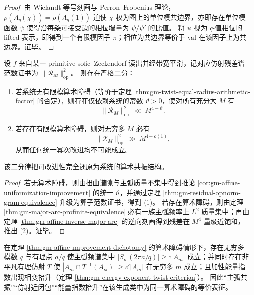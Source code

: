 \begin{proof}
由 Wielandt 等号刻画与 Perron--Frobenius 理论，\(\rho(A_q(\chi))=\rho(A_q(1))\) 迫使 \(\chi\) 权为图上的单位模共边界，亦即存在单位模函数 \(\psi\) 使得沿每条可接受边的相位增量为 \(\psi/\psi'\) 的比值。
将 \(\psi\) 视为 \(q\)-值相位的 lifted 表示，即得到一个有限模因子 \(\pi\)；相位为共边界等价于 \(\mathrm{val}\) 在该因子上为共边界。证毕。
\end{proof}

\begin{theorem}\label{thm:gm-affine-improvement-dichotomy}
设 \(f\) 来自某一 primitive sofic--Zeckendorf 读出并经带宽平滑，记对应仿射残差谱范数证书为 \(\|\mathcal{R}_M\|_{\mathrm{op}}^2\)。
则存在严格二分：
\begin{enumerate}
  \item 若系统无有限模算术障碍（等价于定理 \ref{thm:gm-twist-equal-radius-arithmetic-factor} 的否定），则存在仅依赖系统的常数 \(\vartheta>0\)，使对所有充分大 \(M\) 有
  \[
  \|\mathcal{R}_M\|_{\mathrm{op}}^2\ \ll\ M^{4-\vartheta}.
  \]
  \item 若存在有限模算术障碍，则对无穷多 \(M\) 必有
  \[
  \|\mathcal{R}_M\|_{\mathrm{op}}^2\ \gg\ M^{4-o(1)},
  \]
  从而任何统一幂次改进均不可能成立。
\end{enumerate}
该二分律把可改进性完全还原为系统的算术共振结构。
\end{theorem}

\begin{proof}
若无算术障碍，则由扭曲谱隙与主弧质量不集中得到推论 \ref{cor:gm-affine-uniformization-improvement} 的统一 \(\vartheta\)，并通过定理 \ref{thm:gm-residual-opnorm-gram-equivalence} 升级为算子范数证书，得到 (1)。
若存在算术障碍，则由定理 \ref{thm:gm-major-arc-profinite-equivalence} 必有一族主弧频率上 \(L^2\) 质量集中；再由定理 \ref{thm:gm-affine-inverse-major-arc} 的逆向刻画得到残差在 \(M^4\) 量级近饱和，推出 (2)。证毕。
\end{proof}

\begin{proposition}\label{prop:gm-triple-complementarity}
在定理 \ref{thm:gm-affine-improvement-dichotomy} 的算术障碍情形下，存在无穷多模数 \(q\) 与有理点 \(a/q\) 使主弧频谱集中
\(
|S_m(2\pi a/q)|\ge c|A_m|
\)
成立；并同时存在非平凡有理仿射 \(T\) 使
\(
|A_m\cap T^{-1}(A_m)|\ge c'|A_m|
\)
在无穷多 \(m\) 成立；且加性能量指数出现相变抬升（定理 \ref{thm:gm-energy-exponent-twist-criterion}）。
因此“主弧共振”“仿射近闭包”“能量指数抬升”在该生成类中为同一算术障碍的等价表征。
\end{proposition}

